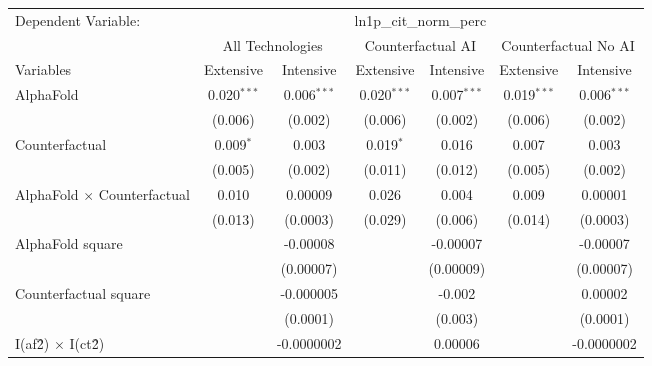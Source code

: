 \begingroup
\centering
\begin{tabular}{lcccccc}
   \tabularnewline \midrule \midrule
   Dependent Variable: & \multicolumn{6}{c}{ln1p\_cit\_norm\_perc}\\
 & \multicolumn{2}{c}{All Technologies} & \multicolumn{2}{c}{Counterfactual AI} & \multicolumn{2}{c}{Counterfactual No AI} \\
\cmidrule(lr){1-1}\cmidrule(lr){2-3} \cmidrule(lr){4-5} \cmidrule(lr){6-7}
Variables & \multicolumn{1}{c}{Extensive} & \multicolumn{1}{c}{Intensive} & \multicolumn{1}{c}{Extensive} & \multicolumn{1}{c}{Intensive} & \multicolumn{1}{c}{Extensive} & \multicolumn{1}{c}{Intensive} \\
\cmidrule(lr){1-1}\cmidrule(lr){2-2} \cmidrule(lr){3-3} \cmidrule(lr){4-4} \cmidrule(lr){5-5} \cmidrule(lr){6-6} \cmidrule(lr){7-7}
   AlphaFold                          & 0.020$^{***}$ & 0.006$^{***}$ & 0.020$^{***}$ & 0.007$^{***}$ & 0.019$^{***}$ & 0.006$^{***}$\\   
                                      & (0.006)       & (0.002)       & (0.006)       & (0.002)       & (0.006)       & (0.002)\\   
   Counterfactual                     & 0.009$^{*}$   & 0.003         & 0.019$^{*}$   & 0.016         & 0.007         & 0.003\\   
                                      & (0.005)       & (0.002)       & (0.011)       & (0.012)       & (0.005)       & (0.002)\\   
   AlphaFold $\times$ Counterfactual  & 0.010         & 0.00009       & 0.026         & 0.004         & 0.009         & 0.00001\\   
                                      & (0.013)       & (0.0003)      & (0.029)       & (0.006)       & (0.014)       & (0.0003)\\   
   AlphaFold square                   &               & -0.00008      &               & -0.00007      &               & -0.00007\\   
                                      &               & (0.00007)     &               & (0.00009)     &               & (0.00007)\\   
   Counterfactual square              &               & -0.000005     &               & -0.002        &               & 0.00002\\   
                                      &               & (0.0001)      &               & (0.003)       &               & (0.0001)\\   
   I(af\^2) $\times$ I(ct\^2)         &               & -0.0000002    &               & 0.00006       &               & -0.0000002\\   

\end{tabular}
